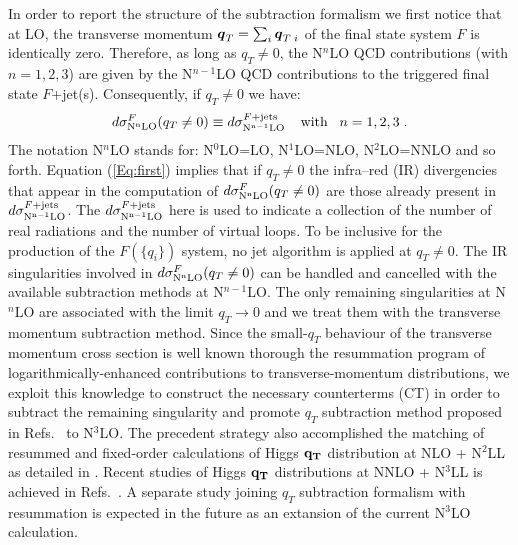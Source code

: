 \documentclass[12pt]{article}
\def\bom#1{{\mbox{\boldmath $#1$}}}
\def\qt{q_T}
\begin{document}
In order to report the structure  of the subtraction formalism we first notice that at LO, the transverse momentum $\bom{q}_{T}=\sum_i \bom{q}_{T\;i}$ of the final state system $F$ is identically zero. Therefore, as long as $\qt \neq 0$, the N$^{n}$LO QCD contributions (with $n=1,2,3$) are given by the N$^{n-1}$LO QCD contributions to the triggered final state $F$+jet(s). Consequently, if $\qt \neq 0$ we have:
\begin{equation}
\label{Eq:first}
d\sigma^{F}_{\rm N^{n}LO}(\qt \neq0) \equiv d\sigma^{F+{\rm jets}}_{\rm N^{n-1}LO}\;\;\;\;{\rm with}\;\;\; n=1,2,3\;.
\end{equation}
The notation N$^{n}$LO stands for: N$^{0}$LO=LO, N$^{1}$LO=NLO, N$^{2}$LO=NNLO and so forth. Equation (\ref{Eq:first})  implies that if $\qt \neq 0$ the infra--red (IR) divergencies that appear in the computation of $d\sigma^{F}_{\rm N^{n}LO}(\qt \neq0)$ are those already present in $d\sigma^{F+{\rm jets}}_{\rm N^{n-1}LO}$. The $d\sigma^{F+{\rm jets}}_{\rm N^{n-1}LO}$ here is used to indicate a collection of the number of real radiations and the number of virtual loops. To be inclusive for the production of the $F(\{q_i\})$ system, no jet algorithm is applied at $\qt \neq 0$. The IR singularities involved in $d\sigma^{F}_{\rm N^{n}LO}(\qt \neq0)$ can be handled and cancelled with the available subtraction methods at N$^{n-1}$LO. The only remaining singularities at  N$^{n}$LO are associated with the limit $\qt \rightarrow 0$ and we treat them with the transverse momentum subtraction method. Since the small-$\qt$ behaviour of the transverse momentum cross section is well known thorough the resummation program \cite{qTRes:program} of logarithmically-enhanced contributions to transverse-momentum distributions, we exploit this knowledge to construct the necessary counterterms (CT) in order to subtract the remaining singularity and promote $q_T$ subtraction method proposed in Refs.~\cite{Catani:2007vq,Bozzi:2005wk,Bozzi:2003jy} to N$^{3}$LO. The precedent strategy also accomplished the matching of resummed and fixed-order calculations of Higgs $\bf \qt$ distribution at NLO + N$^{2}$LL as detailed in \cite{Bozzi:2005wk}. Recent studies of Higgs $\bf \qt$ distributions at NNLO + N$^{3}$LL is achieved in Refs.~\cite{Chen:2018pzu,Bizon:2018foh}. A separate study joining $q_T$ subtraction formalism with resummation is expected in the future as an extansion of the current N$^3$LO calculation. 
\end{document}
